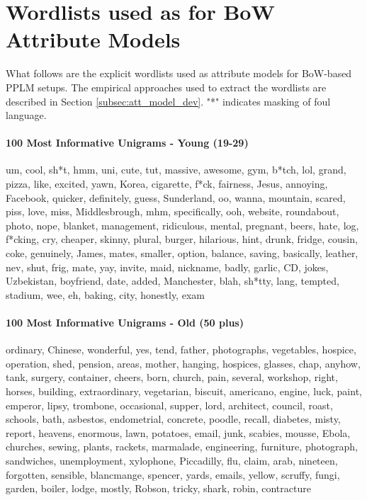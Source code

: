 \section{Wordlists used as for BoW Attribute Models}
\label{sec:wordlists}

What follows are the explicit wordlists used as attribute models for BoW-based PPLM setups. The empirical approaches used to extract the wordlists are described in Section \ref{subsec:att_model_dev}. "*" indicates masking of foul language.


\paragraph{100 Most Informative Unigrams - Young (19-29)} um, cool, sh*t, hmm, uni, cute, tut, massive, awesome, gym, b*tch, lol, grand, pizza, like, excited, yawn, Korea, cigarette, f*ck, fairness, Jesus, annoying, Facebook, quicker, definitely, guess, Sunderland, oo, wanna, mountain, scared, piss, love, miss, Middlesbrough, mhm, specifically, ooh, website, roundabout, photo, nope, blanket, management, ridiculous, mental, pregnant, beers, hate, log, f*cking, cry, cheaper, skinny, plural, burger, hilarious, hint, drunk, fridge, cousin, coke, genuinely, James, mates, smaller, option, balance, saving, basically, leather, nev, shut, frig, mate, yay, invite, maid, nickname, badly, garlic, CD, jokes, Uzbekistan, boyfriend, date, added, Manchester, blah, sh*tty, lang, tempted, stadium, wee, eh, baking, city, honestly, exam

\paragraph{100 Most Informative Unigrams - Old (50 plus)} ordinary, Chinese, wonderful, yes, tend, father, photographs, vegetables, hospice, operation, shed, pension, areas, mother, hanging, hospices, glasses, chap, anyhow, tank, surgery, container, cheers, born, church, pain, several, workshop, right, horses, building, extraordinary, vegetarian, biscuit, americano, engine, luck, paint, emperor, lipsy, trombone, occasional, supper, lord, architect, council, roast, schools, bath, asbestos, endometrial, concrete, poodle, recall, diabetes, misty, report, heavens, enormous, lawn, potatoes, email, junk, scabies, mousse, Ebola, churches, sewing, plants, rackets, marmalade, engineering, furniture, photograph, sandwiches, unemployment, xylophone, Piccadilly, flu, claim, arab, nineteen, forgotten, sensible, blancmange, spencer, yards, emails, yellow, scruffy, fungi, garden, boiler, lodge, mostly, Robson, tricky, shark, robin, contracture

